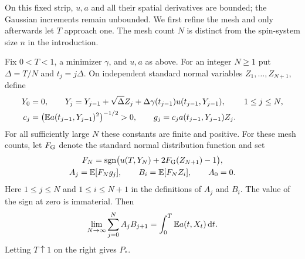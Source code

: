 On this fixed strip, $u,a$ and all their spatial derivatives are bounded;
the Gaussian increments remain unbounded. We first refine the mesh and
only afterwards let $T$ approach one. The mesh count $N$ is distinct
from the spin-system size $n$ in the introduction.

\begin{proposition}\label{prop:gaussian}
Fix $0<T<1$, a minimizer $\gamma$, and $u,a$ as above. For an integer
$N\geq1$ put $\Delta=T/N$ and $t_j=j\Delta$. On independent standard
normal variables $Z_1,\ldots,Z_{N+1}$, define
\begin{align}
 Y_0&=0,\qquad
 Y_j=Y_{j-1}+\sqrt\Delta Z_j
      +\Delta\gamma(t_{j-1})u(t_{j-1},Y_{j-1}),
       &&1\leq j\leq N,\label{eq:euler}\\
 c_j&=\bigl(\mathbb E a(t_{j-1},Y_{j-1})^2\bigr)^{-1/2}>0,
 \qquad g_j=c_j a(t_{j-1},Y_{j-1})Z_j.
       \label{eq:normalized-increment}
\end{align}
For all sufficiently large $N$ these constants are finite and positive.
For these mesh counts, let $F_{\rm G}$ denote the standard normal
distribution function and set
\[
 \begin{gathered}
 F_N=\operatorname{sgn}\bigl(u(T,Y_N)+2F_{\rm G}(Z_{N+1})-1\bigr),\\
 A_j=\mathbb E[F_Ng_j],\qquad B_i=\mathbb E[F_NZ_i],\qquad A_0=0.
 \end{gathered}
\]
Here $1\leq j\leq N$ and $1\leq i\leq N+1$ in the definitions of
$A_j$ and $B_i$.
The value of the sign at zero is immaterial. Then
\begin{equation}\label{eq:finite-value}
 \lim_{N\to\infty}\sum_{j=0}^N A_jB_{j+1}
       =\int_0^T\mathbb E a(t,X_t)\,\mathrm d t.
\end{equation}
Letting $T\uparrow1$ on the right gives $P_*$.
\end{proposition}

